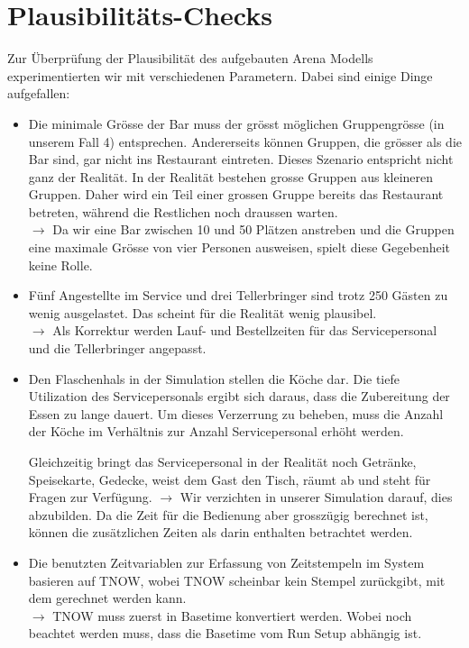 \documentclass[ngerman,a4paper,12pt]{scrreprt}
\begin{document}
			
	\section{Plausibilitäts-Checks}
	Zur Überprüfung der Plausibilität des aufgebauten Arena Modells experimentierten wir mit verschiedenen Parametern. Dabei sind einige Dinge aufgefallen:
	\begin{itemize}
		\item Die minimale Grösse der Bar muss der grösst möglichen Gruppengrösse (in unserem Fall 4) entsprechen. Andererseits können Gruppen, die grösser als die Bar sind, gar nicht ins Restaurant eintreten.
		Dieses Szenario entspricht nicht ganz der Realität. In der Realität bestehen grosse Gruppen aus kleineren Gruppen. Daher wird ein Teil einer grossen Gruppe bereits das Restaurant betreten, während die Restlichen noch draussen warten.\\
		$\rightarrow$ Da wir eine Bar zwischen 10 und 50 Plätzen anstreben und die Gruppen eine maximale Grösse von vier Personen ausweisen, spielt diese Gegebenheit keine Rolle.
		\item Fünf Angestellte im Service und drei Tellerbringer sind trotz 250 Gästen zu wenig ausgelastet. Das scheint für die Realität wenig plausibel.\\
		$\rightarrow$ Als Korrektur werden Lauf- und Bestellzeiten für das Servicepersonal und die Tellerbringer angepasst.
		\item Den Flaschenhals in der Simulation stellen die Köche dar. Die tiefe Utilization des Servicepersonals ergibt sich daraus, dass die Zubereitung der Essen zu lange dauert. Um dieses Verzerrung zu beheben, muss die Anzahl der Köche im Verhältnis zur Anzahl Servicepersonal erhöht werden.
		
		Gleichzeitig bringt das Servicepersonal in der Realität noch Getränke, Speisekarte, Gedecke, weist dem Gast den Tisch, räumt ab und steht für Fragen zur Verfügung.
		$\rightarrow$ Wir verzichten in unserer Simulation darauf, dies abzubilden. Da die Zeit für die Bedienung aber grosszügig berechnet ist, können die zusätzlichen Zeiten als darin enthalten betrachtet werden.
		\item Die benutzten Zeitvariablen zur Erfassung von Zeitstempeln im System basieren auf TNOW, wobei TNOW scheinbar kein Stempel zurückgibt, mit dem gerechnet werden kann.\\
		$\rightarrow$ TNOW muss zuerst in Basetime konvertiert werden. Wobei noch beachtet werden muss, dass die Basetime vom Run Setup abhängig ist.
	\end{itemize}
			
\end{document}
